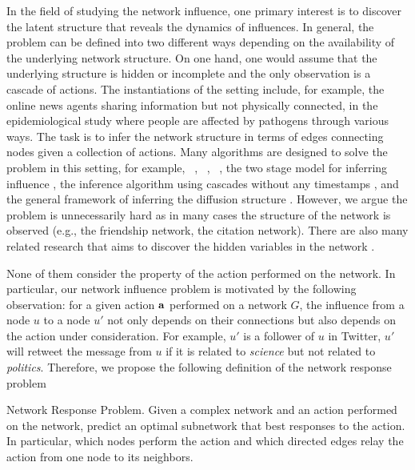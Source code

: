 {In the field of studying the network influence, one primary interest is to discover the latent structure that reveals the dynamics of influences.
In general, the problem can be defined into two different ways depending on the availability of the underlying network structure.
On one hand, one would assume that the underlying structure is hidden or incomplete and the only observation is a cascade of actions.
The instantiations of the setting include, for example,
the online news agents sharing information but not physically connected,
in the epidemiological study where people are affected by pathogens through various ways.
The task is to infer the network structure in terms of edges connecting nodes given a collection of actions.
Many algorithms are designed to solve the problem in this setting, for example, \netinf\ \citep{GomezRodriguez10inferring}, \netrate\ \citep{Rodrigues11unconvering}, \ \citep{Du12learning}, the two stage model for inferring influence \citep{Du14influence}, the inference algorithm using cascades without any timestamps \citep{Amin14learning}, and the general framework of inferring the diffusion structure \citep{Daneshmand14estimating}.
However, we argue the problem is unnecessarily hard as in many cases the structure of the network is observed (e.g., the friendship network, the citation network).
There are also many related research that aims to discover the hidden variables in the network \citep{Lovrek08prediction,Goyal10learning}.

None of them consider the property of the action performed on the network.
In particular, our network influence problem is motivated by the following observation: for a given action $\mathbf {a}$ performed on a network $G$, the influence from a node $u$ to a node $u'$ not only depends on their connections but also depends on the action under consideration.
For example, $u'$ is a follower of $u$ in Twitter, $u'$ will retweet the message from $u$ if it is related to \textit{science} but not related to \textit{politics}.
Therefore, we propose the following definition of the network response problem
\begin{definition}{Network Response Problem.}
	Given a complex network and an action performed on the network, predict an optimal subnetwork that best responses to the action. In particular, which nodes perform the action and which directed edges relay the action from one node to its neighbors.
\end{definition}

}
